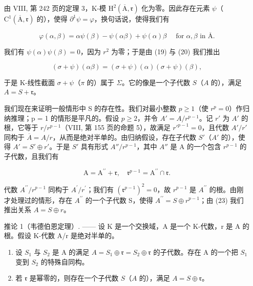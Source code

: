 由 VIII, 第 242 页的定理 3，K-模 \(\mathrm{H}^{2}(\overline{\mathrm{A}},\mathfrak{r})\) 化为零。因此存在元素 \(\psi\)（\(\mathrm{C}^{1}(\overline{\mathrm{A}},\mathfrak{r})\) 的），使得 \(\partial^{1}\psi = \varphi\)，换句话说，使得我们有

\[
\varphi (\alpha , \beta) = \alpha \psi (\beta) - \psi (\alpha \beta) + \psi (\alpha) \beta \quad \text { for } \alpha , \beta \text { in } \overline {{\mathrm{A}}}.\tag{21}
\]

我们有 \(\psi(\alpha)\psi(\beta)=0\)，因为 \(r^{2}\) 为零；于是由 (19) 与 (20) 我们推出

\[
(\sigma + \psi) (\alpha \beta) = (\sigma + \psi) (\alpha) (\sigma + \psi) (\beta),\tag{22}
\]

于是 K-线性截面 \(\sigma +\psi\)（\(\pi\) 的）属于 \(\Sigma\)。它的像是一个子代数 \(S\)（\(A\) 的），满足 \(A = S + \mathfrak{r}\)。

我们现在来证明一般情形中 S 的存在性。我们对最小整数 \(p \geqslant 1\)（使 \(r^{p} = 0\)）作归纳推理；p = 1 的情形是平凡的。假设 \(p \geqslant 2\)，并令 \(A' = A/r^{p-1}\)。记 \(r'\) 为 \(A'\) 的根，它等于 \(r/r^{p-1}\)（VIII, 第 155 页的命题 5），故满足 \(r'^{p-1} = 0\)，且代数 \(A'/r'\) 同构于 \(\overline{A} = A/r\)，从而是绝对半单的。由归纳假设，存在子代数 \(S'\)（\(A'\) 的），使得 \(A' = S' \oplus r'\)。于是 \(S'\) 具有形式 \(A''/r^{p-1}\)，其中 \(A''\) 是 A 的一个包含 \(r^{p-1}\) 的子代数，且我们有

\[
\mathrm{A} = \mathrm{A} ^ {\prime \prime} + \mathfrak {r}, \quad \mathfrak {r} ^ {p - 1} = \mathrm{A} ^ {\prime \prime} \cap \mathfrak {r}.\tag{23}
\]

代数 \(A^{\prime\prime}/r^{p-1}\) 同构于 \(A^{\prime}/r^{\prime}\)；我们有 \((\mathfrak{r}^{p-1})^{2}=0\)，故 \(r^{p-1}\) 是 \(A^{\prime\prime}\) 的根。由刚才处理过的情形，存在 \(A^{\prime\prime}\) 的一个子代数 S，使得 \(A^{\prime\prime}=S\oplus r^{p-1}\)；由 (23) 我们推出关系 \(A=S\oplus r\)。

推论 1（韦德伯恩定理）. —— 设 K 是一个交换域，A 是一个 K-代数，r 是 A 的根。假设 K-代数 A/r 是绝对半单的。

\begin{enumerate}
\def\labelenumi{\alph{enumi})}
\item
  设 \(S_1\) 与 \(S_2\) 是 A 的满足 \(A = S_1 \oplus \mathfrak{r} = S_2 \oplus \mathfrak{r}\) 的子代数。存在 A 的一个把 \(S_1\) 变到 \(S_2\) 的特殊自同构。
\item
  若 \(\mathfrak{r}\) 是幂零的，则存在一个子代数 \(S\)（\(A\) 的），满足 \(A = S \oplus \mathfrak{r}\)。
\end{enumerate}

